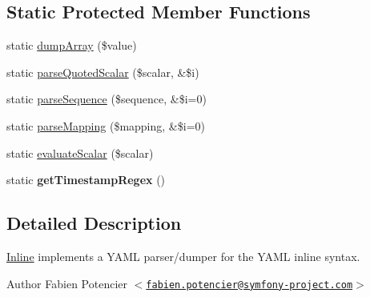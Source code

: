 \subsection*{\-Static \-Protected \-Member \-Functions}
\begin{DoxyCompactItemize}
\item 
static \hyperlink{class_symfony_1_1_component_1_1_yaml_1_1_inline_a14a553e044884f70a2f8fbbd4f2d21ac}{dump\-Array} (\$value)
\item 
static \hyperlink{class_symfony_1_1_component_1_1_yaml_1_1_inline_a217fb6f105d374552ebb185da7e13fc6}{parse\-Quoted\-Scalar} (\$scalar, \&\$i)
\item 
static \hyperlink{class_symfony_1_1_component_1_1_yaml_1_1_inline_a841085bbaa638bd7c47b77bd167d47bc}{parse\-Sequence} (\$sequence, \&\$i=0)
\item 
static \hyperlink{class_symfony_1_1_component_1_1_yaml_1_1_inline_a75c88cc2a3f4c2cf7f23330baa0d0a9f}{parse\-Mapping} (\$mapping, \&\$i=0)
\item 
static \hyperlink{class_symfony_1_1_component_1_1_yaml_1_1_inline_a65675de8bf326ce4d0f1833119db3bd5}{evaluate\-Scalar} (\$scalar)
\item 
\hypertarget{class_symfony_1_1_component_1_1_yaml_1_1_inline_a1d4101aacfa859fd673067059e704239}{
static {\bfseries get\-Timestamp\-Regex} ()}
\label{class_symfony_1_1_component_1_1_yaml_1_1_inline_a1d4101aacfa859fd673067059e704239}

\end{DoxyCompactItemize}


\subsection{\-Detailed \-Description}
\hyperlink{class_symfony_1_1_component_1_1_yaml_1_1_inline}{\-Inline} implements a \-Y\-A\-M\-L parser/dumper for the \-Y\-A\-M\-L inline syntax.

\begin{DoxyAuthor}{\-Author}
\-Fabien \-Potencier $<$\href{mailto:fabien.potencier@symfony-project.com}{\tt fabien.\-potencier@symfony-\/project.\-com}$>$ 
\end{DoxyAuthor}


